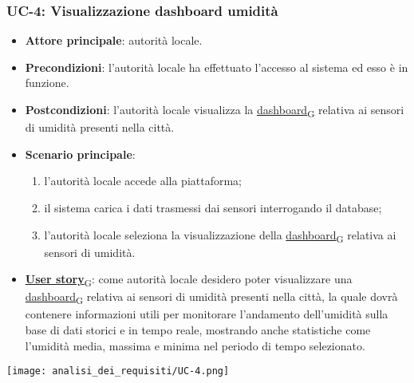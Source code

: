 \subsubsection{UC-4: Visualizzazione dashboard umidità}
\begin{itemize}
	\item \textbf{Attore principale}: autorità locale.
	\item \textbf{Precondizioni}: l'autorità locale ha effettuato l'accesso al sistema ed esso è in funzione.
	\item \textbf{Postcondizioni}: l'autorità locale visualizza la \href{https://7last.github.io/docs/rtb/documentazione-interna/glossario\#dashboard}{dashboard\textsubscript{G}} relativa
	      ai sensori di umidità presenti nella città.
	\item \textbf{Scenario principale}:
	      \begin{enumerate}
		      \item l'autorità locale accede alla piattaforma;
		      \item il sistema carica i dati trasmessi dai sensori interrogando il database;
		      \item l'autorità locale seleziona la visualizzazione della \href{https://7last.github.io/docs/rtb/documentazione-interna/glossario\#dashboard}{dashboard\textsubscript{G}} relativa ai sensori di umidità.
	      \end{enumerate}
	\item \href{https://7last.github.io/docs/rtb/documentazione-interna/glossario\#user-story}{\textbf{User story}\textsubscript{G}}:
	      come autorità locale desidero poter visualizzare una \href{https://7last.github.io/docs/rtb/documentazione-interna/glossario\#dashboard}{dashboard\textsubscript{G}} relativa ai sensori di umidità presenti nella città, la quale
	      dovrà contenere informazioni utili per monitorare l'andamento dell'umidità sulla base di dati storici e in tempo reale, mostrando
	      anche statistiche come l'umidità media, massima e minima nel periodo di tempo selezionato.
\end{itemize}
\begin{center}
	\texttt{[image: analisi\_dei\_requisiti/UC-4.png]}
\end{center}

\newpage

